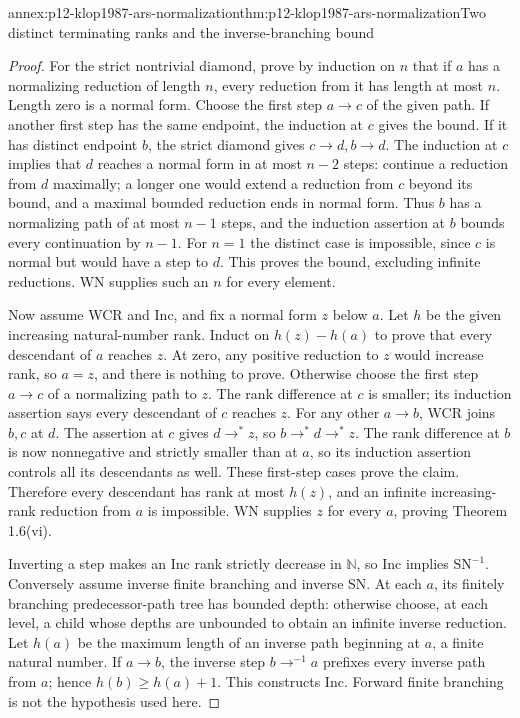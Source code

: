 \begin{annexitem}{annex:p12-klop1987-ars-normalization}{thm:p12-klop1987-ars-normalization}{Two distinct terminating ranks and the inverse-branching bound}
\begin{proof}
For the strict nontrivial diamond, prove by induction on \(n\) that
if \(a\) has a normalizing reduction of length \(n\), every
reduction from it has length at most \(n\). Length zero is a normal
form. Choose the first step \(a\to c\) of the given path.
If another first step has the same endpoint, the induction at \(c\)
gives the bound. If it has distinct endpoint \(b\), the strict
diamond gives \(c\to d,b\to d\). The induction at \(c\)
implies that \(d\) reaches a normal form in at most \(n-2\)
steps: continue a reduction from \(d\) maximally; a longer one
would extend a reduction from \(c\) beyond its bound, and a maximal
bounded reduction ends in normal form. Thus \(b\) has a normalizing
path of at most \(n-1\) steps, and the induction assertion at
\(b\) bounds every continuation by \(n-1\). For \(n=1\)
the distinct case is impossible, since \(c\) is normal but would
have a step to \(d\). This proves the bound, excluding infinite
reductions. WN supplies such an \(n\) for every element.

Now assume WCR and Inc, and fix a normal form \(z\) below \(a\).
Let \(h\) be the given increasing natural-number rank. Induct on
\(h(z)-h(a)\) to prove that every descendant of \(a\) reaches
\(z\). At zero, any positive reduction to \(z\) would increase
rank, so \(a=z\), and there is nothing to prove. Otherwise choose
the first step \(a\to c\) of a normalizing path to \(z\).
The rank difference at \(c\) is smaller; its induction assertion
says every descendant of \(c\) reaches \(z\). For any other
\(a\to b\), WCR joins \(b,c\) at \(d\).
The assertion at \(c\) gives \(d\to^*z\), so
\(b\to^*d\to^*z\). The rank difference at \(b\) is now
nonnegative and strictly smaller than at \(a\), so its induction
assertion controls all its descendants as well. These first-step cases
prove the claim. Therefore every descendant has rank at most \(h(z)\),
and an infinite increasing-rank reduction from \(a\) is impossible.
WN supplies \(z\) for every \(a\), proving Theorem 1.6(vi).

Inverting a step makes an Inc rank strictly decrease in \(\mathbb N\),
so Inc implies \(\mathrm{SN}^{-1}\). Conversely assume inverse
finite branching and inverse SN. At each \(a\), its finitely
branching predecessor-path tree has bounded depth: otherwise choose,
at each level, a child whose depths are unbounded to obtain an infinite
inverse reduction. Let \(h(a)\) be the maximum length of an inverse
path beginning at \(a\), a finite natural number. If \(a\to b\),
the inverse step \(b\to^{-1}a\) prefixes every inverse path
from \(a\); hence \(h(b)\geq h(a)+1\). This constructs Inc.
Forward finite branching is not the hypothesis used here.
\end{proof}
\end{annexitem}

